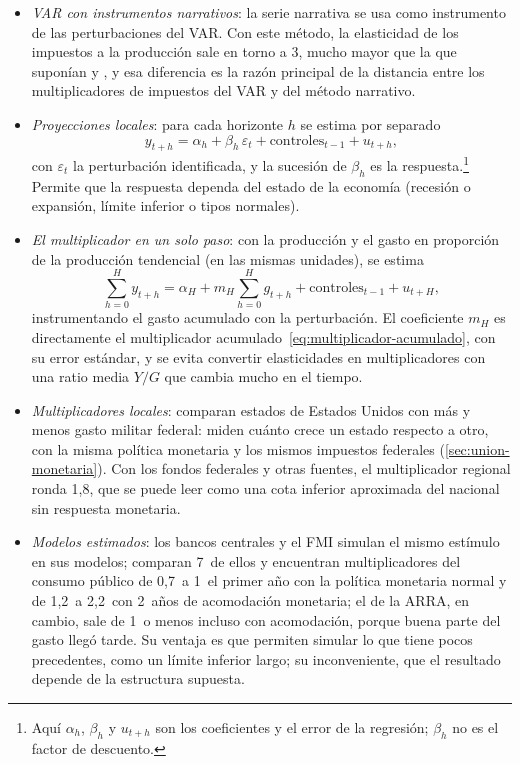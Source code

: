 \documentclass[11pt]{article}
\begin{document}
\begin{itemize}
\item \emph{VAR con instrumentos narrativos}: la serie narrativa se usa como instrumento de las perturbaciones del VAR\nocite{MertensRavn2013Dynamic}. Con este método, la elasticidad de los impuestos a la producción sale en torno a 3, mucho mayor que la que suponían  y , y esa diferencia es la razón principal de la distancia entre los multiplicadores de impuestos del VAR y del método narrativo\nocite{MertensRavn2014Reconciliation}.
\item \emph{Proyecciones locales}\nocite{Jorda2005Estimation}: para cada horizonte $h$ se estima por separado
  \begin{equation*}
  y_{t+h}=\alpha_h+\beta_h\,\varepsilon_t+\text{controles}_{t-1}+u_{t+h},
  \end{equation*}
  con $\varepsilon_t$ la perturbación identificada, y la sucesión de $\beta_h$ es la respuesta.\footnote{Aquí $\alpha_h$, $\beta_h$ y $u_{t+h}$ son los coeficientes y el error de la regresión; $\beta_h$ no es el factor de descuento.} Permite que la respuesta dependa del estado de la economía (recesión o expansión, límite inferior o tipos normales).
\item \emph{El multiplicador en un solo paso}: con la producción y el gasto en proporción de la producción tendencial (en las mismas unidades), se estima
  \begin{equation*}
  \sum_{h=0}^{H}y_{t+h}=\alpha_H+m_H\sum_{h=0}^{H}g_{t+h}+\text{controles}_{t-1}+u_{t+H},
  \end{equation*}
  instrumentando el gasto acumulado con la perturbación. El coeficiente $m_H$ es directamente el multiplicador acumulado~\eqref{eq:multiplicador-acumulado}, con su error estándar, y se evita convertir elasticidades en multiplicadores con una ratio media $Y/G$ que cambia mucho en el tiempo\nocite{RameyZubairy2018,Ramey2016Macroeconomic}.
\item \emph{Multiplicadores locales}: \textcite{NakamuraSteinsson2014} comparan estados de Estados Unidos con más y menos gasto militar federal: miden cuánto crece un estado respecto a otro, con la misma política monetaria y los mismos impuestos federales (\ref{sec:union-monetaria}). Con los fondos federales y otras fuentes, el multiplicador regional ronda 1,8, que se puede leer como una cota inferior aproximada del nacional sin respuesta monetaria\nocite{ChodorowReich2019Geographic}.
\item \emph{Modelos estimados}: los bancos centrales y el FMI simulan el mismo estímulo en sus modelos; \textcite{Coenen2012Multiplicadores} comparan 7~de ellos y encuentran multiplicadores del consumo público de 0,7~a 1~el primer año con la política monetaria normal y de 1,2~a 2,2~con 2~años de acomodación monetaria; el de la ARRA, en cambio, sale de 1~o menos incluso con acomodación, porque buena parte del gasto llegó tarde. Su ventaja es que permiten simular lo que tiene pocos precedentes, como un límite inferior largo; su inconveniente, que el resultado depende de la estructura supuesta.

\end{itemize}
\end{document}
